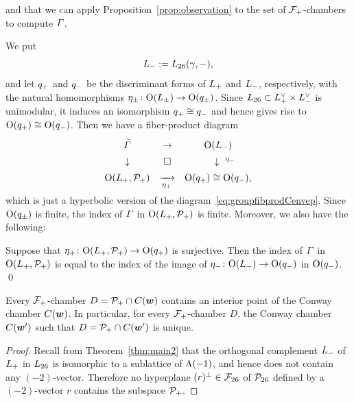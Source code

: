 \documentclass{amsart} %
\begin{document}
and that we can apply
Proposition~\ref{prop:observation}
to the set of $\mathord{\mathcal{F}}_{+}$-chambers
to compute $\varGamma$.
%
\par
We put 
\[
L_{-}:=L_{26}(\gamma, -),
\]
and let $q_{+}$ and $q_{-}$ be the discriminant forms 
of $L_{+}$ and $L_{-}$, respectively,
with the natural homomorphisms $\eta_{\pm}\colon \mathord{\mathrm{O}}(L_{\pm})\to \mathord{\mathrm{O}}(q_{\pm})$.
Since  $L_{26}\subset L_{+}^{\vee}\times L_{-}^{\vee}$  is unimodular, 
it  induces an isomorphism $q_{+}\cong q_{-}$ and hence gives rise to 
$\mathord{\mathrm{O}}(q_{+})\cong \mathord{\mathrm{O}}(q_{-})$.
Then we have 
a  fiber-product diagram
%
\begin{equation}\label{eq:groupfibprodP}
\renewcommand{\arraystretch}{1.4}
\begin{array}{ccc}
\tilvGam &\to & \OG(\Lminus) \\
\downarrow & \square& \downarrow\rlap{ ${}^{\etaminus}$} \\
\OG(\Lplus, \PPPplus) & \maprightsb{\etaplus} & \OG(\qplus)\cong \OG(\qminus), 
\end{array}
\end{equation}
% 
which is just 
a hyperbolic version of the diagram~\eqref{eq:groupfibprodCenvep}.
Since $\mathord{\mathrm{O}}(q_{\pm})$ is finite,  the index of $\varGamma$ in $\mathord{\mathrm{O}}(L_{+}, \mathord{\mathcal{P}}_{+})$ is finite.
Moreover, we also have the following:
%
\begin{proposition}\label{prop:vGamindex}
Suppose that  %
${\eta}_{+}\colon \mathord{\mathrm{O}}(L_{+}, \mathord{\mathcal{P}}_{+}) \to \mathord{\mathrm{O}}(q_{+})$ is surjective.
Then the  index of $\varGamma$ in $\mathord{\mathrm{O}}(L_{+}, \mathord{\mathcal{P}}_{+})$  
is equal to  the index  of the image 
of ${\eta}_{-}\colon \mathord{\mathrm{O}}(L_{-}) \to \mathord{\mathrm{O}}(q_{-})$ 
in $\mathord{\mathrm{O}}(q_{-})$.
\qed
\end{proposition}
%
%
%
\begin{proposition}\label{prop:interior}
Every $\mathord{\mathcal{F}}_{+}$-chamber $D=\mathord{\mathcal{P}}_{+} \cap \mathord{C}(\boldsymbol{w})$
contains an interior point of the Conway chamber $ \mathord{C}(\boldsymbol{w})$.
In particular, for every $\mathord{\mathcal{F}}_{+}$-chamber $D$,
the Conway chamber $ \mathord{C}(\boldsymbol{w}^{\prime}) $
such that $D=\mathord{\mathcal{P}}_{+} \cap \mathord{C}(\boldsymbol{w}^{\prime})$ is unique.
\end{proposition}
%
\begin{proof}
Recall from Theorem~\ref{thm:main2} that 
the orthogonal complement $L_{-}$
 of $L_{+}$ in $L_{26}$
is isomorphic to a sublattice of $\Lambda(-1)$,
and hence does not contain any $(-2)$-vector.
Therefore no hyperplane $(r)^{\perp}\in {\mathord{\mathcal{F}}}_{26}$ of $\mathord{\mathcal{P}}_{26}$ defined by a $(-2)$-vector $r$ 
contains the subspace $\mathord{\mathcal{P}}_{+}$.
\end{proof}
\end{document}
